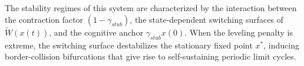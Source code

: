 The stability regimes of this system are characterized by the interaction between the contraction factor $(1 - \gamma_{stub})$, the state-dependent switching surfaces of $\tilde{W}(x(t))$, and the cognitive anchor $\gamma_{stub} x(0)$\cite{acemoglu2013opinion,hajnal1958weak}. When the leveling penalty is extreme, the switching surface destabilizes the stationary fixed point $x^*$, inducing border-collision bifurcations that give rise to self-sustaining periodic limit cycles\cite{acemoglu2013opinion,hajnal1958weak}.

